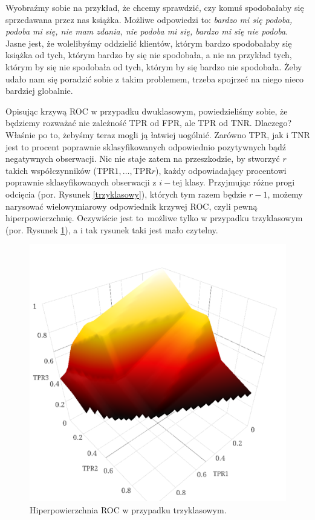 \documentclass{mini}
\begin{document}
Wyobraźmy sobie na przykład, że chcemy sprawdzić, czy komuś spodobałaby się sprzedawana przez nas książka. Możliwe odpowiedzi to: \textit{bardzo mi się podoba, podoba mi się, nie mam zdania, nie podoba mi się, bardzo mi się nie podoba}. Jasne jest, że wolelibyśmy oddzielić klientów, którym bardzo spodobałaby się książka od tych, którym bardzo by się nie spodobała, a nie na przykład tych, którym by się nie spodobała od tych, którym by się bardzo nie spodobała. Żeby udało nam się poradzić sobie z takim problemem, trzeba spojrzeć na niego nieco bardziej globalnie.   

Opisując krzywą ROC w przypadku dwuklasowym, powiedzieliśmy sobie, że będziemy rozważać nie zależność TPR od FPR, ale TPR od TNR. Dlaczego? Właśnie po to, żebyśmy teraz mogli ją łatwiej uogólnić. Zarówno TPR, jak i TNR jest to procent poprawnie sklasyfikowanych odpowiednio pozytywnych bądź negatywnych obserwacji. Nic nie staje zatem na przeszkodzie, by stworzyć $r$ takich współczynników ($\text{TPR}1, \ldots, \text{TPR}r$), każdy odpowiadający procentowi poprawnie sklasyfikowanych obserwacji z $i-$tej klasy. Przyjmując różne progi odcięcia (por. Rysunek \ref{trzyklasowy}), których tym razem będzie $r-1$, możemy narysować wielowymiarowy odpowiednik krzywej ROC, czyli pewną hiperpowierzchnię. Oczywiście jest to~możliwe tylko w przypadku trzyklasowym (por. Rysunek \ref{3d}), a i tak rysunek taki jest mało czytelny. 

\begin{figure}[h]
\begin{center}
\includegraphics[scale=0.5]{graphics/roc3d.png}
\end{center}
\caption{Hiperpowierzchnia ROC w przypadku trzyklasowym.}
\label{3d}
\end{figure}
\end{document}
